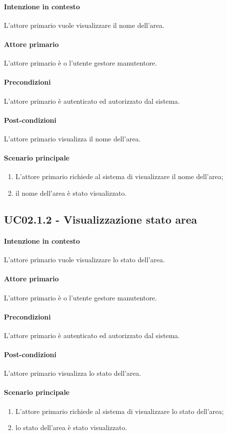\paragraph{Intenzione in contesto} L'attore primario vuole visualizzare il nome dell'area.
\paragraph{Attore primario} L'attore primario è o l'utente gestore manutentore.
\paragraph{Precondizioni}  L'attore primario è autenticato ed autorizzato dal sistema.
\paragraph{Post-condizioni} L'attore primario visualizza il nome dell'area.
\paragraph{Scenario principale}
\begin{enumerate}
    \item L'attore primario richiede al sistema di visualizzare il nome dell'area;
    \item il nome dell'area è stato visualizzato.
\end{enumerate}

\subsection{UC02.1.2 - Visualizzazione stato area}\label{uc:02.1.2}

\paragraph{Intenzione in contesto} L'attore primario vuole visualizzare lo stato dell'area.
\paragraph{Attore primario} L'attore primario è o l'utente gestore manutentore.
\paragraph{Precondizioni}  L'attore primario è autenticato ed autorizzato dal sistema.
\paragraph{Post-condizioni} L'attore primario visualizza lo stato dell'area.
\paragraph{Scenario principale}
\begin{enumerate}
    \item L'attore primario richiede al sistema di visualizzare lo stato dell'area;
    \item lo stato dell'area è stato visualizzato.
\end{enumerate}